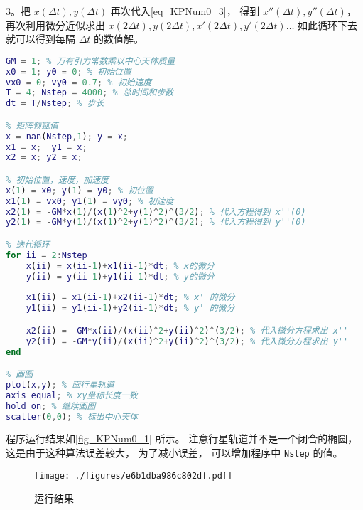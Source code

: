 3。把 $x(\Delta t), y(\Delta t)$ 再次代入\autoref{eq_KPNum0_3}， 得到 $x''(\Delta t), y''(\Delta t)$， 再次利用微分近似求出 $x(2\Delta t), y(2\Delta t), x'(2\Delta t), y'(2\Delta t) \dots$ 如此循环下去就可以得到每隔 $\Delta t$ 的数值解。

\begin{lstlisting}[language=matlab, caption=kepler0.m]
% 参数设定
GM = 1; % 万有引力常数乘以中心天体质量
x0 = 1; y0 = 0; % 初始位置
vx0 = 0; vy0 = 0.7; % 初始速度
T = 4; Nstep = 4000; % 总时间和步数
dt = T/Nstep; % 步长

% 矩阵预赋值
x = nan(Nstep,1); y = x;
x1 = x;  y1 = x;
x2 = x; y2 = x;

% 初始位置，速度，加速度
x(1) = x0; y(1) = y0; % 初位置
x1(1) = vx0; y1(1) = vy0; % 初速度
x2(1) = -GM*x(1)/(x(1)^2+y(1)^2)^(3/2); % 代入方程得到 x''(0)
y2(1) = -GM*y(1)/(x(1)^2+y(1)^2)^(3/2); % 代入方程得到 y''(0)

% 迭代循环
for ii = 2:Nstep
    x(ii) = x(ii-1)+x1(ii-1)*dt; % x的微分
    y(ii) = y(ii-1)+y1(ii-1)*dt; % y的微分
    
    x1(ii) = x1(ii-1)+x2(ii-1)*dt; % x' 的微分
    y1(ii) = y1(ii-1)+y2(ii-1)*dt; % y' 的微分

    x2(ii) = -GM*x(ii)/(x(ii)^2+y(ii)^2)^(3/2); % 代入微分方程求出 x''
    y2(ii) = -GM*y(ii)/(x(ii)^2+y(ii)^2)^(3/2); % 代入微分方程求出 y''
end

% 画图
plot(x,y); % 画行星轨道
axis equal; % xy坐标长度一致
hold on; % 继续画图
scatter(0,0); % 标出中心天体
\end{lstlisting}

程序运行结果如\autoref{fig_KPNum0_1} 所示。 注意行星轨道并不是一个闭合的椭圆， 这是由于这种算法误差较大， 为了减小误差， 可以增加程序中 \verb|Nstep| 的值。
\begin{figure}[ht]
\centering
\texttt{[image: ./figures/e6b1dba986c802df.pdf]}
\caption{运行结果} \label{fig_KPNum0_1}
\end{figure}
